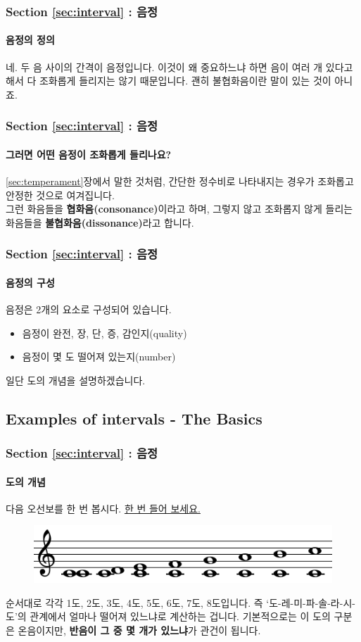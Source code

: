 \documentclass{beamer}
\begin{document}
	\begin{frame}
		\frametitle{Section \ref{sec:interval} : 음정}
		\framesubtitle{음정의 정의}
		네. 두 음 사이의 간격이 음정입니다. 이것이 왜 중요하느냐 하면 음이 여러 개 있다고 해서 다 조화롭게 들리지는 않기 때문입니다. 괜히 불협화음이란 말이 있는 것이 아니죠.
	\end{frame}
	
	\begin{frame}
		\frametitle{Section \ref{sec:interval} : 음정}
		\framesubtitle{그러면 어떤 음정이 조화롭게 들리나요?}
		\ref{sec:temperament}장에서 말한 것처럼, 간단한 정수비로 나타내지는 경우가 조화롭고 안정한 것으로 여겨집니다. \\
		그런 화음들을 {\bf 협화음(consonance)}이라고 하며, 그렇지 않고 조화롭지 않게 들리는 화음들을 {\bf 불협화음(dissonance)}라고 합니다.
	\end{frame}
	
	\begin{frame}
		\frametitle{Section \ref{sec:interval} : 음정}
		\framesubtitle{음정의 구성}
		음정은 2개의 요소로 구성되어 있습니다.
		\begin{itemize}
			\item 음정이 완전, 장, 단, 증, 감인지(quality)
			\item 음정이 몇 도 떨어져 있는지(number)
		\end{itemize}
		일단 도의 개념을 설명하겠습니다.
	\end{frame}
	
	\subsection{Examples of intervals - The Basics}
	\begin{frame}
		\frametitle{Section \ref{sec:interval} : 음정}
		\framesubtitle{도의 개념}
		다음 오선보를 한 번 봅시다. {\color{cyan}\href{run:res/mp3/6/interval/main.mp3}{한 번 들어 보세요.}}
		\begin{figure}
			\centering
			\includegraphics[width=\textwidth]{res/pdf/6/interval/diatonic.pdf}
		\end{figure}
		순서대로 각각 1도, 2도, 3도, 4도, 5도, 6도, 7도, 8도입니다. 즉 `도-레-미-파-솔-라-시-도'의 관계에서 얼마나 떨어져 있느냐로 계산하는 겁니다. 기본적으로는 이 도의 구분은 온음이지만, {\bf 반음이 그 중 몇 개가 있느냐}가 관건이 됩니다.
	\end{frame}
	
\end{document}
